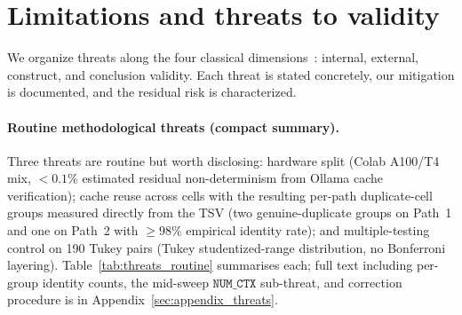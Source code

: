 \section{Limitations and threats to validity}
\label{sec:limitations}

We organize threats along the four classical dimensions~\citep{Wohlin2012ExperimentSE}: internal, external, construct, and conclusion validity. Each threat is stated concretely, our mitigation is documented, and the residual risk is characterized.

\paragraph{Routine methodological threats (compact summary).} Three
threats are routine but worth disclosing: hardware split (Colab
A100/T4 mix, $< 0.1\%$ estimated residual non-determinism from Ollama
cache verification); cache reuse across cells with the resulting
per-path duplicate-cell groups measured directly from the TSV (two
genuine-duplicate groups on Path~1 and one on Path~2 with
$\geq 98\%$ empirical identity rate); and multiple-testing control on
190 Tukey pairs (Tukey studentized-range distribution, no Bonferroni
layering). Table~\ref{tab:threats_routine} summarises each; full text
including per-group identity counts, the mid-sweep $\texttt{NUM\_CTX}$
sub-threat, and correction procedure is in
Appendix~\ref{sec:appendix_threats}.


